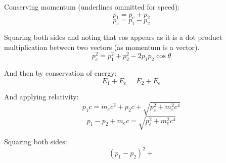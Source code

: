 Conserving momentum (underlines ommitted for speed):
\[
    p_1 = p_e + p_2
\]
\[
    p_e = p_1 - p_2
\]

Squaring both sides and noting that cos appears as it is a dot product multiplication between two vectors (as momentum is a vector).
\[
    p_e^2 = p_1^2 + p_2^2 - 2p_1p_2 \cos \theta
\]

And then by conservation of energy:
\[
    E_1 + E_e = E_2 + E_e
\]

And applying relativity:
\[
    p_1 c = m_e c^2 + p_2 c + \sqrt{p_e^2 + m_e^2 c^4}
\]
\[
    p_1 - p_2 + m_ec = \sqrt{p_e^2 + m_e^2 c^4}
\]

Squaring both sides:
\[
    (p_1 - p_2)^2 +    
\]






